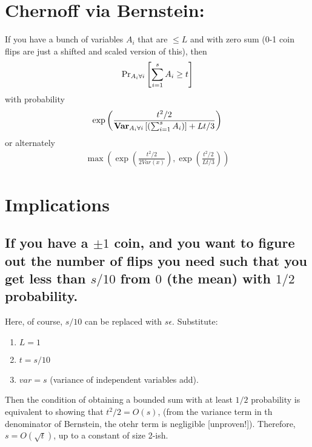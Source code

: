 \documentclass[12pt]{article}
\begin{document}
\section{Chernoff via Bernstein:}
  If you have a bunch of variables $A_i$ that are $\leq L$ and with zero sum (0-1 coin flips are just a shifted and scaled version of this), then
  \begin{align}
  \mbox{Pr}_{A_i \forall i}\left[ \sum_{i=1}^s A_i \geq t \right]
  \end{align}
  with probability 
  \begin{align}
    \exp\left(\frac{t^2/2}{\mbox{\bf Var}_{A_i \forall i}\left[ (\sum_{i=1}^s A_i) \right] + Lt/3}\right)
  \end{align}
  or alternately
  \begin{align}
    \max\left(\exp\left(\frac{t^2/2}{2Var(x)}\right), \exp\left(\frac{t^2/2}{Lt/3}\right)\right)
  \end{align}

  \section{Implications}
  \subsection{If you have a $\pm 1$ coin, and you want to figure out the number of flips you need such that you get less than $s/10$ from $0$ (the mean) with $1/2$ probability.}
  Here, of course, $s/10$ can be replaced with $s\epsilon$.
  Substitute:
  \begin{enumerate}
    \item $L = 1$
    \item $t = s/10$
    \item $var= s$ (variance of independent variables add).
  \end{enumerate}
  Then the condition of obtaining a bounded sum with at least $1/2$ probability is equivalent to showing that $t^2/2 = O(s)$, (from the variance term in th denominator of Bernstein, the otehr term is negligible [unproven!]).
  Therefore, $s = O(\sqrt{t})$, up to a constant of size 2-ish.
\end{document}
